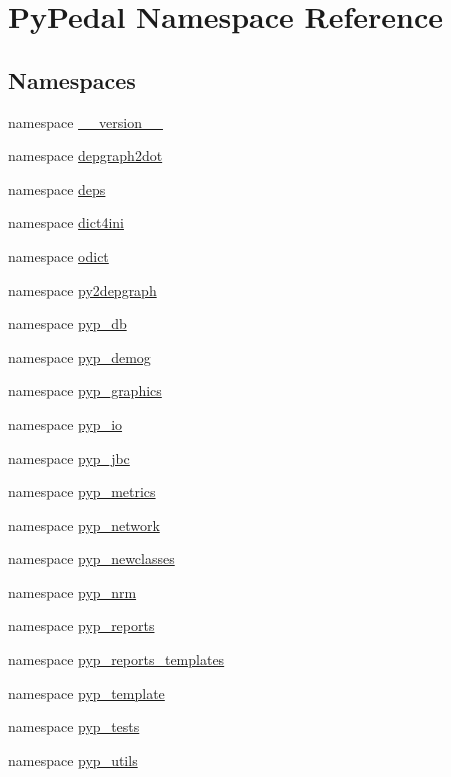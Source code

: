 \hypertarget{namespacePyPedal}{
\section{PyPedal Namespace Reference}
\label{namespacePyPedal}
}


\subsection*{Namespaces}
\begin{CompactItemize}
\item 
namespace \hyperlink{namespacePyPedal_1_1____version____}{\_\-\_\-version\_\-\_\-}
\item 
namespace \hyperlink{namespacePyPedal_1_1depgraph2dot}{depgraph2dot}
\item 
namespace \hyperlink{namespacePyPedal_1_1deps}{deps}
\item 
namespace \hyperlink{namespacePyPedal_1_1dict4ini}{dict4ini}
\item 
namespace \hyperlink{namespacePyPedal_1_1odict}{odict}
\item 
namespace \hyperlink{namespacePyPedal_1_1py2depgraph}{py2depgraph}
\item 
namespace \hyperlink{namespacePyPedal_1_1pyp__db}{pyp\_\-db}
\item 
namespace \hyperlink{namespacePyPedal_1_1pyp__demog}{pyp\_\-demog}
\item 
namespace \hyperlink{namespacePyPedal_1_1pyp__graphics}{pyp\_\-graphics}
\item 
namespace \hyperlink{namespacePyPedal_1_1pyp__io}{pyp\_\-io}
\item 
namespace \hyperlink{namespacePyPedal_1_1pyp__jbc}{pyp\_\-jbc}
\item 
namespace \hyperlink{namespacePyPedal_1_1pyp__metrics}{pyp\_\-metrics}
\item 
namespace \hyperlink{namespacePyPedal_1_1pyp__network}{pyp\_\-network}
\item 
namespace \hyperlink{namespacePyPedal_1_1pyp__newclasses}{pyp\_\-newclasses}
\item 
namespace \hyperlink{namespacePyPedal_1_1pyp__nrm}{pyp\_\-nrm}
\item 
namespace \hyperlink{namespacePyPedal_1_1pyp__reports}{pyp\_\-reports}
\item 
namespace \hyperlink{namespacePyPedal_1_1pyp__reports__templates}{pyp\_\-reports\_\-templates}
\item 
namespace \hyperlink{namespacePyPedal_1_1pyp__template}{pyp\_\-template}
\item 
namespace \hyperlink{namespacePyPedal_1_1pyp__tests}{pyp\_\-tests}
\item 
namespace \hyperlink{namespacePyPedal_1_1pyp__utils}{pyp\_\-utils}
\end{CompactItemize}
